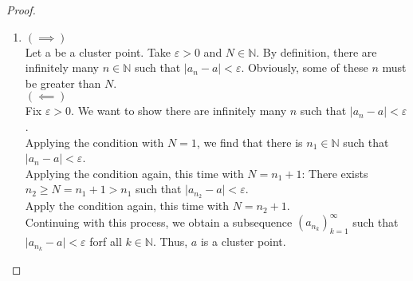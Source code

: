 \begin{proof}\\
    \begin{enumerate}
        \item 
    \(\left(\implies\right)\)\\
    Let a be a cluster point. Take \(\varepsilon > 0\) and \(N \in \mathbb N\). By definition, there are infinitely many \(n\in \mathbb N\) such that \(|a_n - a| < \varepsilon\). Obviously, some of these \(n\) must be greater than \(N\).\\
    \(\left(\impliedby\right)\)\\
    Fix \(\varepsilon > 0\). We want to show there are infinitely many \(n\) such that \(|a_n - a| < \varepsilon\). \\
    Applying the condition with \(N = 1\), we find that there is \(n_1 \in \mathbb N\) such that \(|a_n - a| < \varepsilon\).\\
    Applying the condition again, this time with \(N = n_1 + 1\): There exists \(n_2 \ge N = n_1 + 1 > n_1\) such that \(\big\vert a_{n_2} - a\big\vert < \varepsilon\).\\
    Apply the condition again, this time with \(N = n_2 + 1\).\\
    Continuing with this process, we obtain a subsequence \(\left(a_{n_k}\right)_{k=1}^\infty\) such that \(\big\vert a_{n_k} - a\big\vert < \varepsilon\) forf all \(k \in \mathbb N\). Thus, \(a\) is a cluster point.
\end{enumerate}
\end{proof}
